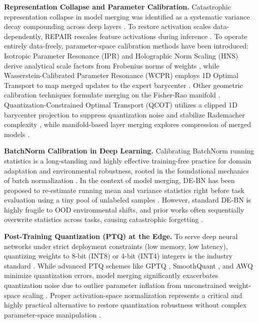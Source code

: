 \documentclass{article}
\theoremstyle{plain}
\theoremstyle{definition}
\theoremstyle{remark}
\begin{document}
\textbf{Representation Collapse and Parameter Calibration.} Catastrophic representation collapse in model merging was identified as a systematic variance decay compounding across deep layers \cite{jordan2023repair}. To restore activation scales data-dependently, REPAIR rescales feature activations during inference \cite{jordan2023repair}. To operate entirely data-freely, parameter-space calibration methods have been introduced: Isotropic Parameter Resonance (IPR) and Holographic Norm Scaling (HNS) derive analytical scale factors from Frobenius norms of weights \cite{visionary2026holographic, anonymous2026b}, while Wasserstein-Calibrated Parameter Resonance (WCPR) employs 1D Optimal Transport to map merged updates to the expert barycenter \cite{anonymous2026c}. Other geometric calibration techniques formulate merging on the Fisher-Rao manifold \cite{wang2026functionality}. Quantization-Constrained Optimal Transport (QCOT) utilizes a clipped 1D barycenter projection to suppress quantization noise and stabilize Rademacher complexity \cite{anonymous2026b}, while manifold-based layer merging explores compression of merged models \cite{mka2024compressing}.

\textbf{BatchNorm Calibration in Deep Learning.} Calibrating BatchNorm running statistics is a long-standing and highly effective training-free practice for domain adaptation and environmental robustness, rooted in the foundational mechanics of batch normalization \cite{ioffe2015batch, santurkar2018how, lubana2021theoretical, li2018revisiting, nado2020evaluating, schneider2020improving}. In the context of model merging, DE-BN has been proposed to re-estimate running mean and variance statistics right before task evaluation using a tiny pool of unlabeled samples \cite{jordan2023calibrating, kim2024task}. However, standard DE-BN is highly fragile to OOD environmental shifts, and prior works often sequentially overwrite statistics across tasks, causing catastrophic forgetting \cite{anonymous2026a}.

\textbf{Post-Training Quantization (PTQ) at the Edge.} To serve deep neural networks under strict deployment constraints (low memory, low latency), quantizing weights to 8-bit (INT8) or 4-bit (INT4) integers is the industry standard \cite{gholami2021survey, han2015deep}. While advanced PTQ schemes like GPTQ \cite{frantar2022gptq}, SmoothQuant \cite{xiao2023smoothquant}, and AWQ \cite{lin2023awq} minimize quantization errors, model merging significantly exacerbates quantization noise due to outlier parameter inflation from unconstrained weight-space scaling \cite{anonymous2026b, shin2025merge, wang2026epmq}. Proper activation-space normalization represents a critical and highly practical alternative to restore quantization robustness without complex parameter-space manipulation \cite{anonymous2026a, kim2025task}.
\end{document}

